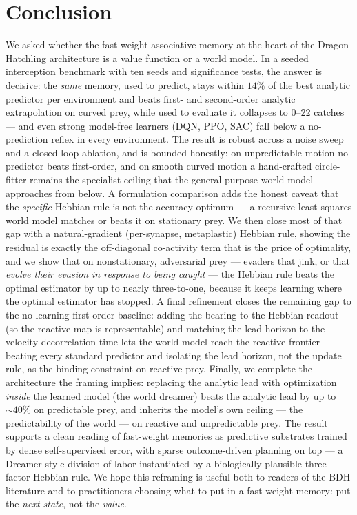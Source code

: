 \documentclass[11pt]{article}
\begin{document}
\section{Conclusion}\label{sec:conclusion}

We asked whether the fast-weight associative memory at the heart of the Dragon Hatchling
architecture is a value function or a world model. In a seeded interception benchmark with ten
seeds and significance tests, the answer is decisive: the \emph{same} memory, used to predict,
stays within $14\%$ of the best analytic predictor per environment and beats first- and
second-order analytic extrapolation on curved prey, while used to evaluate it collapses to
$0$--$22$ catches --- and even strong model-free learners (DQN, PPO, SAC) fall below a
no-prediction reflex in every environment. The result is robust across a noise sweep and a
closed-loop ablation, and is bounded honestly: on unpredictable motion no predictor beats
first-order, and on smooth curved motion a hand-crafted circle-fitter remains the specialist
ceiling that the general-purpose world model approaches from below. A formulation comparison
adds the honest caveat that the \emph{specific} Hebbian rule is not the accuracy optimum --- a
recursive-least-squares world model matches or beats it on stationary prey. We then close most
of that gap with a natural-gradient (per-synapse, metaplastic) Hebbian rule, showing the residual
is exactly the off-diagonal co-activity term that is the price of optimality, and we show that on
nonstationary, adversarial prey --- evaders that jink, or that \emph{evolve their evasion in
response to being caught} --- the Hebbian rule beats the optimal estimator by up to nearly three-to-one,
because it keeps learning where the optimal estimator has stopped. A final refinement closes the
remaining gap to the no-learning first-order baseline: adding the bearing to the Hebbian readout (so
the reactive map is representable) and matching the lead horizon to the velocity-decorrelation time
lets the world model reach the reactive frontier --- beating every standard predictor and isolating
the lead horizon, not the update rule, as the binding constraint on reactive prey. Finally, we
complete the architecture the framing implies: replacing the analytic lead with optimization
\emph{inside} the learned model (the world dreamer) beats the analytic lead by up to $\sim\!40\%$ on
predictable prey, and inherits the model's own ceiling --- the predictability of the world --- on
reactive and unpredictable prey. The result
supports a clean
reading of fast-weight memories as predictive substrates trained by dense self-supervised
error, with sparse outcome-driven planning on top --- a Dreamer-style division of labor
instantiated by a biologically plausible three-factor Hebbian rule. We hope this reframing is
useful both to readers of the BDH literature and to practitioners choosing what to put in a
fast-weight memory: put the \emph{next state}, not the \emph{value}.
\end{document}
